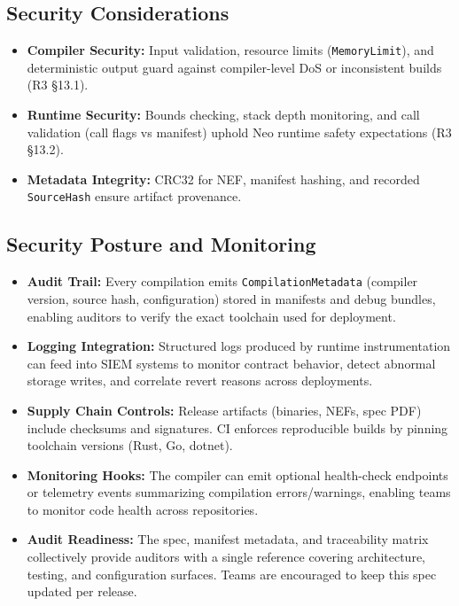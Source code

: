 \documentclass[11pt]{article}
\begin{document}
\subsection{Security Considerations}
\begin{itemize}
    \item \textbf{Compiler Security:} Input validation, resource limits (\texttt{MemoryLimit}), and deterministic output guard against compiler-level DoS or inconsistent builds (R3 \S13.1).
    \item \textbf{Runtime Security:} Bounds checking, stack depth monitoring, and call validation (call flags vs manifest) uphold Neo runtime safety expectations (R3 \S13.2).
    \item \textbf{Metadata Integrity:} CRC32 for NEF, manifest hashing, and recorded \texttt{SourceHash} ensure artifact provenance.
\end{itemize}

\subsection{Security Posture and Monitoring}
\begin{itemize}
    \item \textbf{Audit Trail:} Every compilation emits \texttt{CompilationMetadata} (compiler version, source hash, configuration) stored in manifests and debug bundles, enabling auditors to verify the exact toolchain used for deployment.
    \item \textbf{Logging Integration:} Structured logs produced by runtime instrumentation can feed into SIEM systems to monitor contract behavior, detect abnormal storage writes, and correlate revert reasons across deployments.
    \item \textbf{Supply Chain Controls:} Release artifacts (binaries, NEFs, spec PDF) include checksums and signatures. CI enforces reproducible builds by pinning toolchain versions (Rust, Go, dotnet).
    \item \textbf{Monitoring Hooks:} The compiler can emit optional health-check endpoints or telemetry events summarizing compilation errors/warnings, enabling teams to monitor code health across repositories.
    \item \textbf{Audit Readiness:} The spec, manifest metadata, and traceability matrix collectively provide auditors with a single reference covering architecture, testing, and configuration surfaces. Teams are encouraged to keep this spec updated per release.
\end{itemize}
\end{document}
